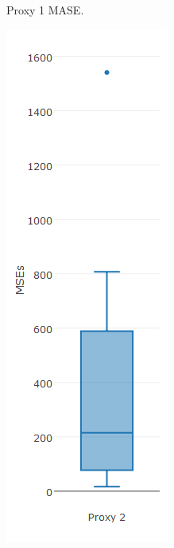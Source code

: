 \begin{figure}[!h]
{\begin{subfigure}{.25\linewidth}
  \caption{Proxy 1 MASE.}
  \label{fig:bp2.2a}
\end{subfigure}
\begin{subfigure}{.25\linewidth}
  \centering
  \includegraphics[width=\linewidth]{img/10ymaMsebpKnn.png}

\end{subfigure}}
\end{figure}
